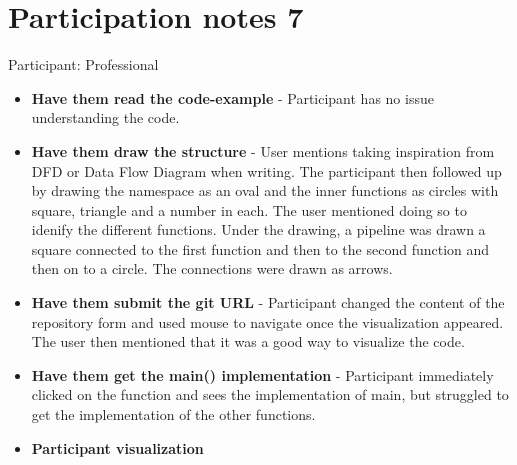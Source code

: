 \section{Participation notes 7}
Participant: Professional

\begin{itemize}
    \item \textbf{Have them read the code-example} - Participant has no issue understanding the code. 
    \item \textbf{Have them draw the structure} - User mentions taking inspiration from DFD or Data Flow Diagram when writing. The participant then followed up by drawing the namespace as an oval and the inner functions as circles with square, triangle and a number in each. The user mentioned doing so to idenify the different functions. Under the drawing, a pipeline was drawn a square connected to the first function and then to the second function and then on to a circle. The connections were drawn as arrows. 
    \item \textbf{Have them submit the git URL} - Participant changed  the content of the repository form and used mouse to navigate once the visualization appeared. The user then mentioned that it was a good way to visualize the code.
    \item \textbf{Have them get the main() implementation} - Participant immediately clicked on the function and sees the implementation of main, but struggled to get the implementation of the other functions. 
    \item \textbf{Participant visualization} 
\end{itemize}